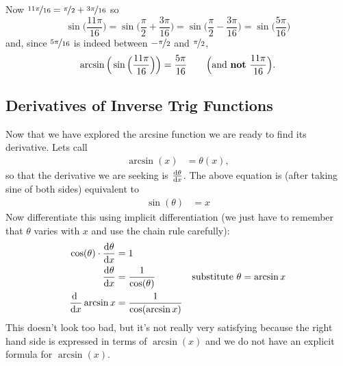 \begin{eg}
Now $\nicefrac{11\pi}{16}=\nicefrac{\pi}{2} +\nicefrac{3\pi}{16}$ so
\begin{equation*}
\sin\Big(\frac{11\pi}{16}\Big)
=\sin\Big(\frac{\pi}{2}+\frac{3\pi}{16}\Big)
=\sin\Big(\frac{\pi}{2}-\frac{3\pi}{16}\Big)
=\sin\Big(\frac{5\pi}{16}\Big)
\end{equation*}
and, since $\nicefrac{5\pi}{16}$ is indeed between $-\nicefrac{\pi}{2}$ and
$\nicefrac{\pi}{2}$,
\begin{equation*}
\arcsin\Big(\sin\Big(\frac{11\pi}{16}\Big)\Big)
=\frac{5\pi}{16}\qquad\Big(\text{and \textbf{not} $\frac{11\pi}{16}$}\Big).
\end{equation*}

\end{eg}

\subsection*{Derivatives of Inverse Trig Functions}
Now that we have explored the arcsine function we are ready to find its derivative.
Lets call
\begin{align*}
  \arcsin(x) &= \theta(x),
\end{align*}
so that the derivative we are seeking is $\diff{\theta}{x}$. The above equation is (after
taking sine of both sides) equivalent to
\begin{align*}
  \sin(\theta) &= x
\end{align*}
Now differentiate this using implicit differentiation (we just have to remember
that $\theta$ varies with $x$ and use the chain rule carefully):
\begin{align*}
  \cos(\theta) \cdot \diff{\theta}{x} &= 1 \\
  \diff{\theta}{x} &= \frac{1}{\cos(\theta)} & \text{substitute $\theta = \arcsin x$}\\
  \diff{}{x} \arcsin x &= \frac{1}{\cos(\arcsin x)}
\end{align*}
This doesn't look too bad, but it's not really very satisfying because the right hand
side is expressed in terms of $\arcsin(x)$ and we do not have an explicit formula for
$\arcsin(x)$.

